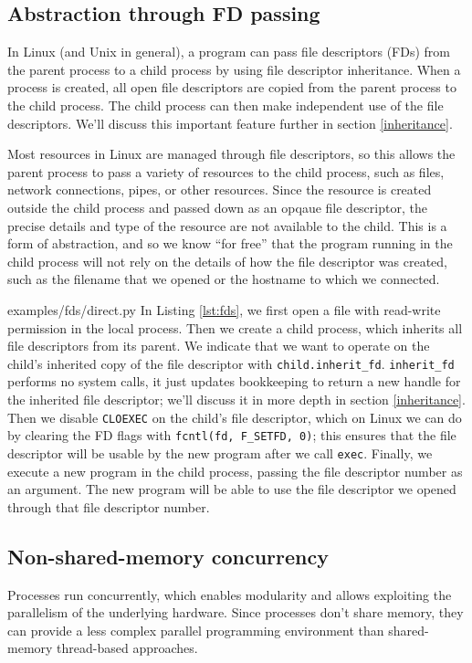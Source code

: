 \documentclass[letterpaper,twocolumn,10pt]{article}
\begin{document}
\subsection{Abstraction through FD passing}\label{fd_abstraction}
In Linux (and Unix in general),
a program can pass file descriptors (FDs) from the parent process to a child process
by using file descriptor inheritance\cite{tlpi}.
When a process is created, all open file descriptors are copied from the parent process to the child process.
The child process can then make independent use of the file descriptors.
We'll discuss this important feature further in section \ref{inheritance}.

Most resources in Linux are managed through file descriptors,
so this allows the parent process to pass a variety of resources to the child process,
such as files, network connections, pipes, or other resources\cite{ucspi}.
Since the resource is created outside the child process and passed down as an opqaue file descriptor,
the precise details and type of the resource are not available to the child.
This is a form of abstraction,
and so we know ``for free''\cite{theoremsforfree}
that the program running in the child process
will not rely on the details of how the file descriptor was created,
such as the filename that we opened or the hostname to which we connected.


{examples/fds/direct.py}
In Listing \ref{lst:fds},
we first open a file with read-write permission in the local process.
Then we create a child process,
which inherits all file descriptors from its parent.
We indicate that we want to operate on the child's inherited copy of the file descriptor with \verb|child.inherit_fd|.
\texttt{inherit\_fd} performs no system calls,
it just updates bookkeeping to return a new handle for the inherited file descriptor;
we'll discuss it in more depth in section \ref{inheritance}.
Then we disable \texttt{CLOEXEC} on the child's file descriptor,
which on Linux we can do by clearing the FD flags with \verb|fcntl(fd, F_SETFD, 0)|;
this ensures that the file descriptor will be usable by the new program after we call \texttt{exec}.
Finally, we execute a new program in the child process,
passing the file descriptor number as an argument.
The new program will be able to use the file descriptor we opened through that file descriptor number.
\subsection{Non-shared-memory concurrency}
Processes run concurrently,
which enables modularity
and allows exploiting the parallelism of the underlying hardware.
Since processes don't share memory,
they can provide a less complex parallel programming environment
than shared-memory thread-based approaches\cite{threads}.
\end{document}
